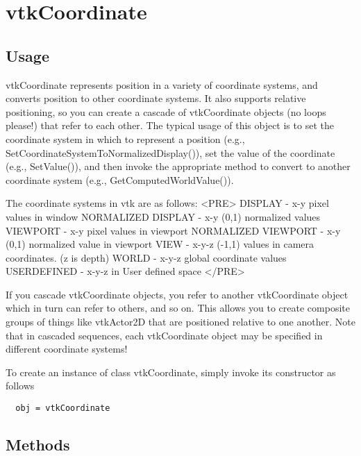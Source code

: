 \section{vtkCoordinate}

\subsection{Usage}

 vtkCoordinate represents position in a variety of coordinate systems, and
 converts position to other coordinate systems. It also supports relative
 positioning, so you can create a cascade of vtkCoordinate objects (no loops
 please!) that refer to each other. The typical usage of this object is
 to set the coordinate system in which to represent a position (e.g., 
 SetCoordinateSystemToNormalizedDisplay()), set the value of the coordinate
 (e.g., SetValue()), and then invoke the appropriate method to convert to 
 another coordinate system (e.g., GetComputedWorldValue()).
 
 The coordinate systems in vtk are as follows:
<PRE>
  DISPLAY -             x-y pixel values in window
  NORMALIZED DISPLAY -  x-y (0,1) normalized values
  VIEWPORT -            x-y pixel values in viewport
  NORMALIZED VIEWPORT - x-y (0,1) normalized value in viewport
  VIEW -                x-y-z (-1,1) values in camera coordinates. (z is depth)
  WORLD -               x-y-z global coordinate values
  USERDEFINED -         x-y-z in User defined space
</PRE>

 If you cascade vtkCoordinate objects, you refer to another vtkCoordinate
 object which in turn can refer to others, and so on. This allows you to
 create composite groups of things like vtkActor2D that are positioned
 relative to one another. Note that in cascaded sequences, each
 vtkCoordinate object may be specified in different coordinate systems!

To create an instance of class vtkCoordinate, simply
invoke its constructor as follows
\begin{verbatim}
  obj = vtkCoordinate
\end{verbatim}
\subsection{Methods}

